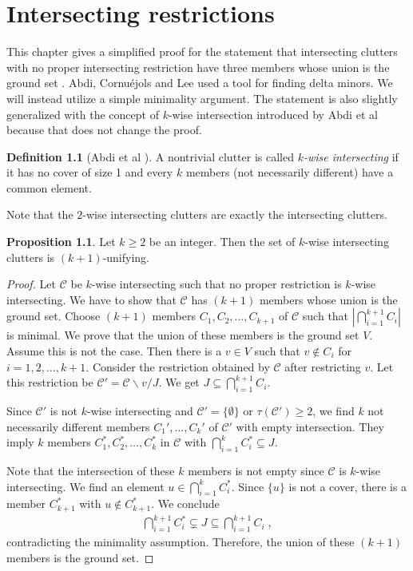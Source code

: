 \documentclass[a4paper, 12pt]{scrbook}
\theoremstyle{definition}
\newtheorem*{definition}{Definition}
\newtheorem{proposition}[theorem]{Proposition}
\begin{document}
   \chapter{Intersecting restrictions}
   This chapter gives a simplified proof for the statement that intersecting clutters with no proper intersecting restriction have three members whose union is the ground set \cite{restrictions}.
   Abdi, Cornuéjols and Lee used a tool for finding delta minors.
   We will instead utilize a simple minimality argument.
   The statement is also slightly generalized with the concept of $k$-wise intersection introduced by Abdi et al \cite{k-wise} because that does not change the proof.
   \begin{definition}[Abdi et al \cite{k-wise}]
       A nontrivial clutter is called \emph{$k$-wise intersecting} if it has no cover of size 1 and every $k$ members (not necessarily different) have a common element.
   \end{definition}

   Note that the $2$-wise intersecting clutters are exactly the intersecting clutters.
   \begin{proposition}
       Let $k\geq 2$ be an integer.
       Then the set of $k$-wise intersecting clutters is $(k+1)$-unifying.
   \end{proposition}

   \begin{proof}
       Let $\mathcal{C}$ be $k$-wise intersecting such that no proper restriction is $k$-wise intersecting.
       We have to show that $\mathcal{C}$ has $(k+1)$ members whose union is the ground set.
       Choose $(k+1)$ members $C_1, C_2, \ldots, C_{k+1}$ of $\mathcal{C}$ such that $|\bigcap_{i=1}^{k+1} C_i|$ is minimal.
       We prove that the union of these members is the ground set $V$.
       Assume this is not the case.
       Then there is a $v \in V$ such that $v \not\in C_i$ for $i=1,2, \ldots, k+1$.
       Consider the restriction obtained by $\mathcal{C}$ after restricting $v$.
       Let this restriction be $\mathcal{C'}=\mathcal{C} \backslash v / J$.
       We get $J \subseteq \bigcap_{i=1}^{k+1} C_i$.

       Since $\mathcal{C'}$ is not $k$-wise intersecting and $\mathcal{C'}=\{\emptyset\}$ or $\tau(\mathcal{C'})\geq 2$, we find $k$ not necessarily different members $C_1',\ldots, C_k'$ of $\mathcal{C'}$ with empty intersection.
       They imply $k$ members $C_1^*, C_2^*,\ldots, C_k^*$ in $\mathcal{C}$ with $\bigcap_{i=1}^k C_i^* \subseteq J$.

       Note that the intersection of these $k$ members is not empty since $\mathcal{C}$ is $k$-wise intersecting.
       We find an element $u \in \bigcap_{i=1}^k C_i^*$. Since $\{u\}$ is not a cover, there is a member $C_{k+1}^*$ with $u \not\in C_{k+1}^*$.
       We conclude
       \begin{align*}
           \bigcap_{i=1}^{k+1} C_i^* \subsetneq J \subseteq \bigcap_{i=1}^{k+1} C_i \;,
       \end{align*}
       contradicting the minimality assumption.
       Therefore, the union of these $(k+1)$ members is the ground set.
   \end{proof}
\end{document}
